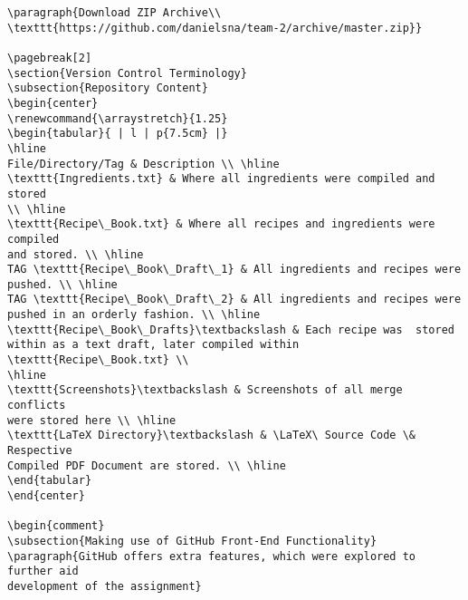 \documentclass[a4paper,twoside,12pt]{article}
\begin{document}
\begin{verbatim}
\paragraph{Download ZIP Archive\\ 
\texttt{https://github.com/danielsna/team-2/archive/master.zip}}

\pagebreak[2]
\section{Version Control Terminology}
\subsection{Repository Content}
\begin{center}
\renewcommand{\arraystretch}{1.25}
\begin{tabular}{ | l | p{7.5cm} |}
\hline
File/Directory/Tag & Description \\ \hline
\texttt{Ingredients.txt} & Where all ingredients were compiled and stored 
\\ \hline
\texttt{Recipe\_Book.txt} & Where all recipes and ingredients were compiled 
and stored. \\ \hline
TAG \texttt{Recipe\_Book\_Draft\_1} & All ingredients and recipes were 
pushed. \\ \hline
TAG \texttt{Recipe\_Book\_Draft\_2} & All ingredients and recipes were 
pushed in an orderly fashion. \\ \hline
\texttt{Recipe\_Book\_Drafts}\textbackslash & Each recipe was  stored 
within as a text draft, later compiled within \texttt{Recipe\_Book.txt} \\ 
\hline
\texttt{Screenshots}\textbackslash & Screenshots of all merge conflicts 
were stored here \\ \hline
\texttt{LaTeX Directory}\textbackslash & \LaTeX\ Source Code \& Respective 
Compiled PDF Document are stored. \\ \hline
\end{tabular}
\end{center}

\begin{comment}
\subsection{Making use of GitHub Front-End Functionality}
\paragraph{GitHub offers extra features, which were explored to further aid 
development of the assignment}

\end{verbatim}
\end{document}
